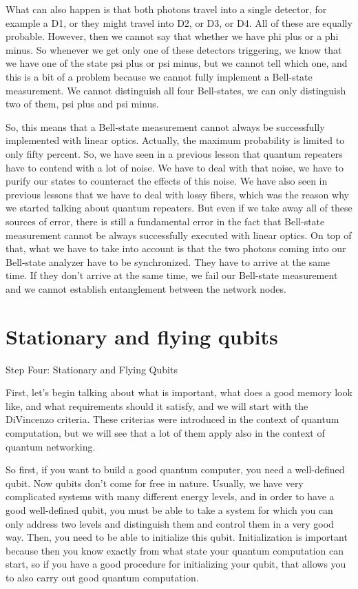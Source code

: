 What can also happen is that both photons travel into a single detector, for example a D1, or they might travel into D2, or D3, or D4. All of these are equally probable. However, then we cannot say that whether we have phi plus or a phi minus. So whenever we get only one of these detectors triggering, we know that we have one of the state psi plus or psi minus, but we cannot tell which one, and this is a bit of a problem because we cannot fully implement a Bell-state measurement. We cannot distinguish all four Bell-states, we can only distinguish two of them, psi plus and psi minus.

So, this means that a Bell-state measurement cannot always be successfully implemented with linear optics. Actually, the maximum probability is limited to only fifty percent. So, we have seen in a previous lesson that quantum repeaters have to contend with a lot of noise. We have to deal with that noise, we have to purify our states to counteract the effects of this noise. We have also seen in previous lessons that we have to deal with lossy fibers, which was the reason why we started talking about quantum repeaters. But even if we take away all of these sources of error, there is still a fundamental error in the fact that Bell-state measurement cannot be always successfully executed with linear optics. On top of that, what we have to take into account is that the two photons coming into our Bell-state analyzer have to be synchronized. They have to arrive at the same time. If they don't arrive at the same time, we fail our Bell-state measurement and we cannot establish entanglement between the network nodes.



\section{Stationary and flying qubits}

Step Four: Stationary and Flying Qubits

First, let's begin talking about what is important, what does a good memory look like, and what requirements should it satisfy, and we will start with the DiVincenzo criteria. These criterias were introduced in the context of quantum computation, but we will see that a lot of them apply also in the context of quantum networking.

So first, if you want to build a good quantum computer, you need a well-defined qubit. Now qubits don't come for free in nature. Usually, we have very complicated systems with many different energy levels, and in order to have a good well-defined qubit, you must be able to take a system for which you can only address two levels and distinguish them and control them in a very good way. Then, you need to be able to initialize this qubit. Initialization is important because then you know exactly from what state your quantum computation can start, so if you have a good procedure for initializing your qubit, that allows you to also carry out good quantum computation.

